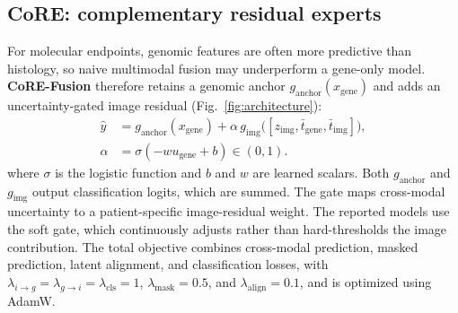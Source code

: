 \subsection{CoRE: complementary residual experts}
\label{sec:core}
For molecular endpoints, genomic features are often more predictive than histology, so naive multimodal fusion may underperform a gene-only model. \textbf{CoRE-Fusion} therefore retains a genomic anchor $g_{\mathrm{anchor}}(x_{\mathrm{gene}})$ and adds an uncertainty-gated image residual (Fig.~\ref{fig:architecture}):
\begin{equation}
\begin{aligned}
\hat{y}
&= g_{\mathrm{anchor}}(x_{\mathrm{gene}})
 + \alpha\, g_{\mathrm{img}}
 \bigl([z_{\mathrm{img}},\bar{t}_{\mathrm{gene}},
 \bar{t}_{\mathrm{img}}]\bigr), \\
\alpha
&= \sigma(-w u_{\mathrm{gene}}+b)\in(0,1).
\end{aligned}
\end{equation}
where $\sigma$ is the logistic function and $b$ and $w$ are learned scalars.
Both $g_{\mathrm{anchor}}$ and $g_{\mathrm{img}}$ output classification logits,
which are summed. The gate maps cross-modal uncertainty to a patient-specific
image-residual weight. The reported models use the soft gate, which continuously adjusts
rather than hard-thresholds the image contribution. The total
objective combines cross-modal prediction, masked prediction,
latent alignment, and classification losses, with
$\lambda_{i\rightarrow g}=\lambda_{g\rightarrow i}=\lambda_{\mathrm{cls}}=1$,
$\lambda_{\mathrm{mask}}=0.5$, and $\lambda_{\mathrm{align}}=0.1$,
and is optimized using AdamW.